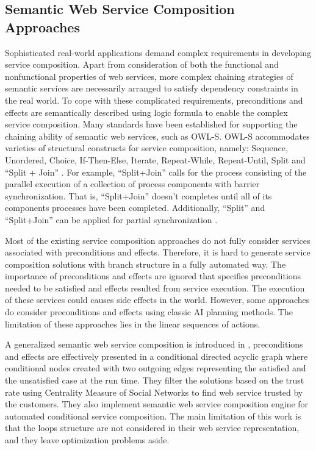 \subsection{Semantic Web Service Composition Approaches}\label{Semantic}
Sophisticated real-world applications demand complex requirements in developing service composition. Apart from consideration of both the functional and nonfunctional properties of web services, more complex chaining strategies of semantic services are necessarily arranged to satisfy dependency constraints in the real world. To cope with these complicated requirements, preconditions and effects are semantically described using logic formula to enable the complex service composition. Many standards have been established for supporting the chaining ability of semantic web services, such as OWL-S. OWL-S accommodates varieties of structural constructs for service composition, namely: Sequence, Unordered, Choice, If-Then-Else, Iterate, Repeat-While, Repeat-Until, Split and ``Split + Join'' \cite{wang2014automated}. For example, ``Split+Join'' calls for the process consisting of the parallel execution of a collection of process components with barrier synchronization. That is, ``Split+Join'' doesn't completes until all of its components processes have been completed. Additionally, ``Split'' and ``Split+Join'' can be applied for partial synchronization \cite{wang2014automated}.

Most of the existing service composition approaches do not fully consider services associated with preconditions and effects. Therefore, it is hard to generate service composition solutions with branch structure in a fully automated way. The importance of preconditions and effects are ignored that specifies preconditions needed to be satisfied and effects resulted from service execution. The execution of these services could causes side effects in the world. However, some approaches do consider preconditions and effects using classic AI planning methods. The limitation of these approaches lies in the linear sequences of actions.


A generalized semantic web service composition is introduced in \cite{bansal2016generalized}, preconditions and effects are effectively presented in a conditional directed acyclic graph where conditional nodes created with two outgoing edges representing the satisfied and the unsatisfied case at the run time. They filter the solutions based on the trust rate using Centrality Measure of Social Networks to find web service trusted by the customers. They also implement semantic web service composition engine for automated conditional service composition. The main limitation of this work is that the loops structure are not considered in their web service representation, and they leave optimization problems aside.

